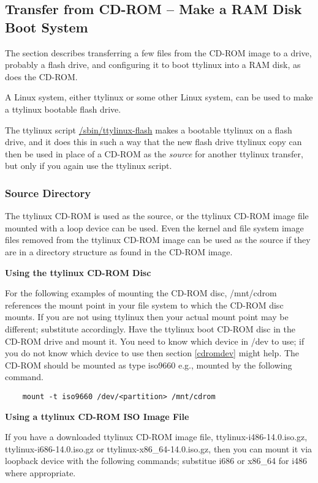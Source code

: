\documentclass[10pt]{article}
\begin{document}
\subsection{Transfer from CD-ROM -- Make a RAM Disk Boot System}
\label{bootflash}

The section describes transferring a few files from the CD-ROM image to a drive,
probably a flash drive, and configuring it to boot ttylinux into a RAM disk, as
does the CD-ROM.

A Linux system, either ttylinux or some other Linux system, can be used to make
a ttylinux bootable flash drive.

The ttylinux script \url{/sbin/ttylinux-flash} makes a bootable ttylinux on a
flash drive, and it does this in such a way that the new flash drive ttylinux
copy can then be used in place of a CD-ROM as the {\it source} for another
ttylinux transfer, but only if you again use the ttylinux script.

\subsubsection{Source Directory}

The ttylinux CD-ROM is used as the source, or the ttylinux CD-ROM image file
mounted with a loop device can be used. Even the kernel and file system image
files removed from the ttylinux CD-ROM image can be used as the source if they
are in a directory structure as found in the CD-ROM image.

{\bf Using the ttylinux CD-ROM Disc}

For the following examples of mounting the CD-ROM disc, /mnt/cdrom references
the mount point in your file system to which the CD-ROM disc mounts. If you are
not using ttylinux then your actual mount point may be different; substitute
accordingly. Have the ttylinux boot CD-ROM disc in the CD-ROM drive and mount
it. You need to know which device in /dev to use; if you do not know which
device to use then section \ref{cdromdev} might help. The CD-ROM should be
mounted as type iso9660 e.g., mounted by the following command.

\begin{lstlisting}
	mount -t iso9660 /dev/<partition> /mnt/cdrom
\end{lstlisting}

{\bf Using a ttylinux CD-ROM ISO Image File}

If you have a downloaded ttylinux CD-ROM image file, ttylinux-i486-14.0.iso.gz,
ttylinux-i686-14.0.iso.gz or ttylinux-x86\_64-14.0.iso.gz, then you can mount
it via loopback device with the following commands; substitue i686 or x86\_64
for i486 where appropriate.
\end{document}
